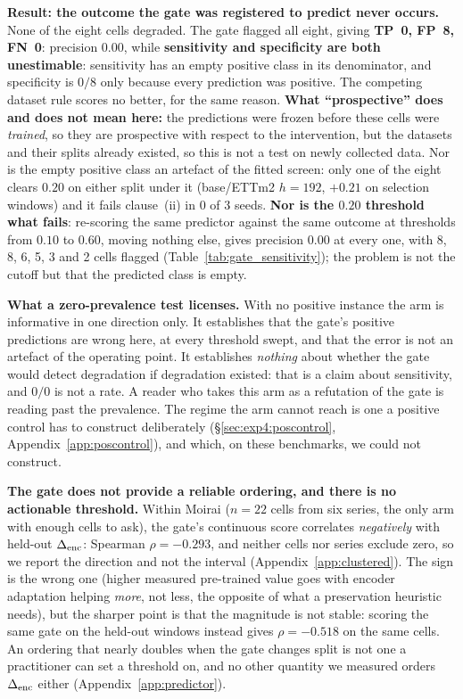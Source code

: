 \textbf{Result: the outcome the gate was registered to predict never occurs.}
None of the eight cells degraded.  The gate flagged all eight, giving
\textbf{TP~0, FP~8, FN~0}: precision $0.00$, while \textbf{sensitivity and
specificity are both unestimable}: sensitivity has an empty positive class in its
denominator, and specificity is $0/8$ only because every prediction was positive.
The competing dataset rule scores no better, for the same reason.  \textbf{What
``prospective'' does and does not mean here:} the predictions were frozen before
these cells were \emph{trained}, so they are prospective with respect to the
intervention, but the datasets and their splits already existed, so this is not a
test on newly collected data.  Nor is the empty positive class an artefact of the
fitted screen: only one of the eight clears $0.20$ on either split under it
(base/ETTm2 $h{=}192$, $+0.21$ on selection windows) and it fails clause~(ii) in 0
of 3 seeds.  \textbf{Nor is the $0.20$ threshold
what fails}: re-scoring the same predictor against the same outcome at thresholds
from $0.10$ to $0.60$, moving nothing else, gives precision $0.00$ at every one,
with 8, 8, 6, 5, 3 and 2 cells flagged (Table~\ref{tab:gate_sensitivity}); the
problem is not the cutoff but that the predicted class is empty.

\textbf{What a zero-prevalence test licenses.} With no positive instance the arm
is informative in one direction only. It establishes that the gate's positive
predictions are wrong here, at every threshold swept, and that the error is not an
artefact of the operating point. It establishes \emph{nothing} about whether the
gate would detect degradation if degradation existed: that is a claim about
sensitivity, and $0/0$ is not a rate. A reader who takes this arm as a refutation
of the gate is reading past the prevalence. The regime the arm cannot reach is
one a positive control has to construct deliberately
(\S\ref{sec:exp4:poscontrol}, Appendix~\ref{app:poscontrol}), and which, on
these benchmarks, we could not construct.

\textbf{The gate does not provide a reliable ordering, and there is no actionable
threshold.}
Within Moirai ($n{=}22$ cells from six series, the only arm with enough cells to
ask), the gate's continuous score correlates \emph{negatively} with held-out
$\Delta_\text{enc}$: Spearman $\rho{=}{-}0.293$, and neither cells nor series exclude zero, so
we report the direction and not the interval (Appendix~\ref{app:clustered}).
The sign is the wrong one (higher measured pre-trained value goes with encoder
adaptation helping \emph{more}, not less, the opposite of what a preservation
heuristic needs), but the sharper point is that the magnitude is not stable:
scoring the same gate on the held-out windows instead gives $\rho{=}{-}0.518$
on the same cells.
An ordering that nearly doubles when the gate changes split is not one a
practitioner can set a threshold on, and no other quantity we measured orders
$\Delta_\text{enc}$ either (Appendix~\ref{app:predictor}).

